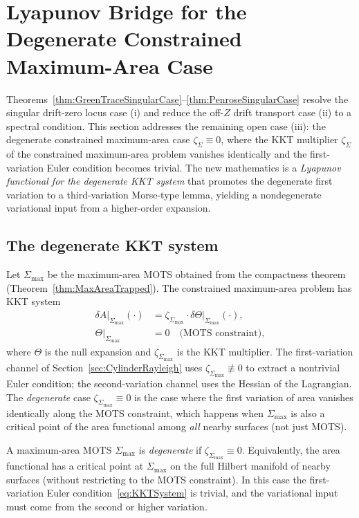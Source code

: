 \section{Lyapunov Bridge for the Degenerate Constrained Maximum-Area Case}
\label{sec:DegenerateKKTBridge}

Theorems~\ref{thm:GreenTraceSingularCase}--\ref{thm:PenroseSingularCase} resolve the singular drift-zero locus case (i) and reduce the off-$Z$ drift transport case (ii) to a spectral condition. This section addresses the remaining open case (iii): the degenerate constrained maximum-area case $\zeta_\Sigma\equiv 0$, where the KKT multiplier $\zeta_\Sigma$ of the constrained maximum-area problem vanishes identically and the first-variation Euler condition becomes trivial. The new mathematics is a \emph{Lyapunov functional for the degenerate KKT system} that promotes the degenerate first variation to a third-variation Morse-type lemma, yielding a nondegenerate variational input from a higher-order expansion.

\subsection{The degenerate KKT system}

Let $\Sigma_{\max}$ be the maximum-area MOTS obtained from the compactness theorem (Theorem~\ref{thm:MaxAreaTrapped}). The constrained maximum-area problem has KKT system
\begin{equation}\label{eq:KKTSystem}
    \begin{aligned}
        \delta A|_{\Sigma_{\max}}(\cdot)&=\zeta_{\Sigma_{\max}}\cdot\delta\Theta|_{\Sigma_{\max}}(\cdot),\\
        \Theta|_{\Sigma_{\max}}&=0\quad\text{(MOTS constraint)},
    \end{aligned}
\end{equation}
where $\Theta$ is the null expansion and $\zeta_{\Sigma_{\max}}$ is the KKT multiplier. The first-variation channel of Section~\ref{sec:CylinderRayleigh} uses $\zeta_{\Sigma_{\max}}\not\equiv 0$ to extract a nontrivial Euler condition; the second-variation channel uses the Hessian of the Lagrangian. The \emph{degenerate} case $\zeta_{\Sigma_{\max}}\equiv 0$ is the case where the first variation of area vanishes identically along the MOTS constraint, which happens when $\Sigma_{\max}$ is also a critical point of the area functional among \emph{all} nearby surfaces (not just MOTS).

\begin{definition}\label{def:DegenerateMOTS}
A maximum-area MOTS $\Sigma_{\max}$ is \emph{degenerate} if $\zeta_{\Sigma_{\max}}\equiv 0$. Equivalently, the area functional has a critical point at $\Sigma_{\max}$ on the full Hilbert manifold of nearby surfaces (without restricting to the MOTS constraint). In this case the first-variation Euler condition~\eqref{eq:KKTSystem} is trivial, and the variational input must come from the second or higher variation.
\end{definition}

